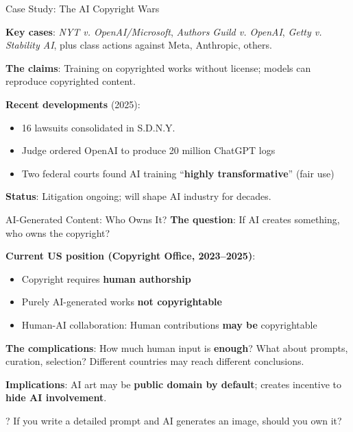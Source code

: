 \documentclass[aspectratio=169]{beamer}
\begin{document}
\begin{frame}{Case Study: The AI Copyright Wars}
\begin{casestudybox}
\textbf{Key cases}: \textit{NYT v. OpenAI/Microsoft}, \textit{Authors Guild v. OpenAI}, \textit{Getty v. Stability AI}, plus class actions against Meta, Anthropic, others.
\end{casestudybox}

\vspace{0.2cm}
\textbf{The claims}: Training on copyrighted works without license; models can reproduce copyrighted content.

\vspace{0.2cm}
\textbf{Recent developments} (2025):
\begin{itemize}
    \item 16 lawsuits consolidated in S.D.N.Y.
    \item Judge ordered OpenAI to produce 20 million ChatGPT logs
    \item Two federal courts found AI training ``\textbf{highly transformative}'' (fair use)
\end{itemize}

\textbf{Status}: Litigation ongoing; will shape AI industry for decades.
\end{frame}

\begin{frame}{AI-Generated Content: Who Owns It?}
\textbf{The question}: If AI creates something, who owns the copyright?

\vspace{0.2cm}
\textbf{Current US position (Copyright Office, 2023--2025)}:
\begin{itemize}
    \item Copyright requires \textbf{human authorship}
    \item Purely AI-generated works \textbf{not copyrightable}
    \item Human-AI collaboration: Human contributions \textbf{may be} copyrightable
\end{itemize}

\vspace{0.2cm}
\textbf{The complications}: How much human input is \textbf{enough}? What about prompts, curation, selection? Different countries may reach different conclusions.

\vspace{0.1cm}
\textbf{Implications}: AI art may be \textbf{public domain by default}; creates incentive to \textbf{hide AI involvement}.

\begin{alertblock}{?}
If you write a detailed prompt and AI generates an image, should you own it?
\end{alertblock}
\end{frame}
\end{document}
